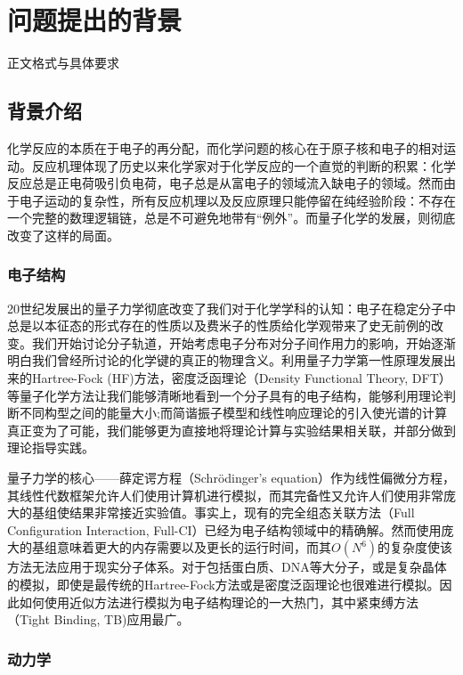 \section{问题提出的背景}

\par 正文格式与具体要求\cite{zjuthesisrules}

\subsection{背景介绍}
化学反应的本质在于电子的再分配，而化学问题的核心在于原子核和电子的相对运动。反应机理体现了历史以来化学家对于化学反应的一个直觉的判断的积累：化学反应总是正电荷吸引负电荷，电子总是从富电子的领域流入缺电子的领域。然而由于电子运动的复杂性，所有反应机理以及反应原理只能停留在纯经验阶段：不存在一个完整的数理逻辑链，总是不可避免地带有``例外''。而量子化学的发展，则彻底改变了这样的局面。

\subsubsection{电子结构}
20世纪发展出的量子力学彻底改变了我们对于化学学科的认知：电子在稳定分子中总是以本征态的形式存在的性质以及费米子的性质给化学观带来了史无前例的改变。我们开始讨论分子轨道，开始考虑电子分布对分子间作用力的影响，开始逐渐明白我们曾经所讨论的化学键的真正的物理含义。利用量子力学第一性原理发展出来的Hartree-Fock (HF)方法，密度泛函理论（Density Functional Theory, DFT）等量子化学方法让我们能够清晰地看到一个分子具有的电子结构，能够利用理论判断不同构型之间的能量大小;而简谐振子模型和线性响应理论的引入使光谱的计算真正变为了可能，我们能够更为直接地将理论计算与实验结果相关联，并部分做到理论指导实践。

量子力学的核心——薛定谔方程（Schr\"odinger's equation）作为线性偏微分方程，其线性代数框架允许人们使用计算机进行模拟，而其完备性又允许人们使用非常庞大的基组使结果非常接近实验值。事实上，现有的完全组态关联方法（Full Configuration Interaction, Full-CI）已经为电子结构领域中的精确解。然而使用庞大的基组意味着更大的内存需要以及更长的运行时间，而其$O(N^6)$的复杂度使该方法无法应用于现实分子体系。对于包括蛋白质、DNA等大分子，或是复杂晶体的模拟，即使是最传统的Hartree-Fock方法或是密度泛函理论也很难进行模拟。因此如何使用近似方法进行模拟为电子结构理论的一大热门，其中紧束缚方法（Tight Binding, TB)应用最广。

\subsubsection{动力学}


